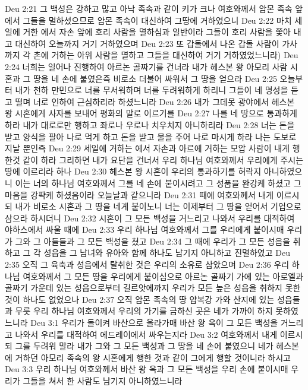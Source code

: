 Deu 2:21  그 백성은 강하고 많고 아낙 족속과 같이 키가 크나 여호와께서 암몬 족속 앞에서 그들을 멸하셨으므로 암몬 족속이 대신하여 그땅에 거하였으니
Deu 2:22  마치 세일에 거한 에서 자손 앞에 호리 사람을 멸하심과 일반이라 그들이 호리 사람을 쫓아 내고 대신하여 오늘까지 거기 거하였으며
Deu 2:23  또 갑돌에서 나온 갑돌 사람이 가사까지 각 촌에 거하는 아위 사람을 멸하고 그들을 대신하여 거기 거하였었느니라)
Deu 2:24  너희는 일어나 진행하여 아르논 골짜기를 건너라 내가 헤스본 왕 아모리 사람 시혼과 그 땅을 네 손에 붙였은즉 비로소 더불어 싸워서 그 땅을 얻으라
Deu 2:25  오늘부터 내가 천하 만민으로 너를 무서워하며 너를 두려워하게 하리니 그들이 네 명성을 듣고 떨며 너로 인하여 근심하리라 하셨느니라
Deu 2:26  내가 그데못 광야에서 헤스본 왕 시혼에게 사자를 보내어 평화의 말로 이르기를
Deu 2:27  나를 네 땅으로 통과하게 하라 내가 대로로만 행하고 좌로나 우로나 치우치지 아니하리라
Deu 2:28  너는 돈을 받고 양식을 팔아 나로 먹게 하고 돈을 받고 물을 주어 나로 마시게 하라 나는 도보로 지날 뿐인즉
Deu 2:29  세일에 거하는 에서 자손과 아르에 거하는 모압 사람이 내게 행한것 같이 하라 그리하면 내가 요단을 건너서 우리 하나님 여호와께서 우리에게 주시는 땅에 이르리라 하나
Deu 2:30  헤스본 왕 시혼이 우리의 통과하기를 허락지 아니하였으니 이는 너의 하나님 여호와께서 그를 네 손에 붙이시려고 그 성품을 완강케 하셨고 그 마음을 강퍅케 하셨음이라 오늘날과 같으니라
Deu 2:31  때에 여호와께서 내게 이르시되 내가 비로소 시혼과 그 땅을 네게 붙이노니 너는 이제부터 그 땅을 얻어서 기업으로 삼으라 하시더니
Deu 2:32  시혼이 그 모든 백성을 거느리고 나와서 우리를 대적하여 야하스에서 싸울 때에
Deu 2:33  우리 하나님 여호와께서 그를 우리에게 붙이시매 우리가 그와 그 아들들과 그 모든 백성을 쳤고
Deu 2:34  그 때에 우리가 그 모든 성읍을 취하고 그 각 성읍을 그 남녀와 유아와 함께 하나도 남기지 아니하고 진멸하였고
Deu 2:35  오직 그 육축과 성읍에서 탈취한 것은 우리의 소유로 삼았으며
Deu 2:36  우리 하나님 여호와께서 그 모든 땅을 우리에게 붙이심으로 아르논 골짜기 가에 있는 아로엘과 골짜기 가운데 있는 성읍으로부터 길르앗에까지 우리가 모든 높은 성읍을 취하지 못한 것이 하나도 없었으나
Deu 2:37  오직 암몬 족속의 땅 얍복강 가와 산지에 있는 성읍들과 무릇 우리 하나님 여호와께서 우리의 가기를 금하신 곳은 네가 가까이 하지 못하였느니라
Deu 3:1  우리가 돌이켜 바산으로 올라가매 바산 왕 옥이 그 모든 백성을 거느리고 나와서 우리를 대적하여 에드레이에서 싸우는지라
Deu 3:2  여호와께서 내게 이르시되 그를 두려워 말라 내가 그와 그 모든 백성과 그 땅을 네 손에 붙였으니 네가 헤스본에 거하던 아모리 족속의 왕 시혼에게 행한 것과 같이 그에게 행할 것이니라 하시고
Deu 3:3  우리 하나님 여호와께서 바산 왕 옥과 그 모든 백성을 우리 손에 붙이시매 우리가 그들을 쳐서 한 사람도 남기지 아니하였느니라
